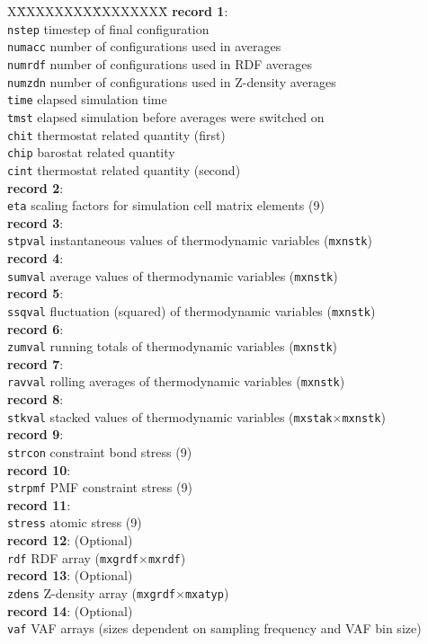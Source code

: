 \begin{tabbing}
X\=XXXXXXXX\=XXXXXXXX\=\kill
{\bf record 1}: \\
\> {\tt nstep}  \> timestep of final configuration \\
\> {\tt numacc} \> number of configurations used in averages \\
\> {\tt numrdf} \> number of configurations used in RDF averages \\
\> {\tt numzdn} \> number of configurations used in Z-density averages \\
\> {\tt time}   \> elapsed simulation time \\
\> {\tt tmst}   \> elapsed simulation before averages were switched on \\
\> {\tt chit}   \> thermostat related quantity (first) \\
\> {\tt chip}   \> barostat related quantity \\
\> {\tt cint}   \> thermostat related quantity (second) \\
{\bf record 2}: \\
\> {\tt eta}    \>  scaling factors for simulation cell matrix elements (9) \\
{\bf record 3}: \\
\> {\tt stpval} \>  instantaneous values of thermodynamic variables ({\tt mxnstk}) \\
{\bf record 4}: \\
\> {\tt sumval} \>  average values of thermodynamic variables ({\tt mxnstk}) \\
{\bf record 5}: \\
\> {\tt ssqval} \>  fluctuation (squared) of thermodynamic variables ({\tt mxnstk}) \\
{\bf record 6}: \\
\> {\tt zumval} \>  running totals of thermodynamic variables ({\tt mxnstk}) \\
{\bf record 7}: \\
\> {\tt ravval} \>  rolling averages of thermodynamic variables ({\tt mxnstk}) \\
{\bf record 8}: \\
\> {\tt stkval} \>  stacked values of thermodynamic variables ({\tt mxstak}$\times${\tt mxnstk}) \\
{\bf record 9}: \\
\> {\tt strcon} \>  constraint bond stress (9) \\
{\bf record 10}: \\
\> {\tt strpmf} \>  PMF constraint stress (9) \\
{\bf record 11}: \\
\> {\tt stress} \>  atomic stress (9) \\
{\bf record 12}: (Optional) \\
\> {\tt rdf}    \> RDF array ({\tt mxgrdf}$\times${\tt mxrdf}) \\
{\bf record 13}: (Optional) \\
\> {\tt zdens}  \> Z-density array ({\tt mxgrdf}$\times${\tt mxatyp}) \\
{\bf record 14}: (Optional) \\
\> {\tt vaf}    \> VAF arrays (sizes dependent on sampling frequency and VAF bin size)
\end{tabbing}

